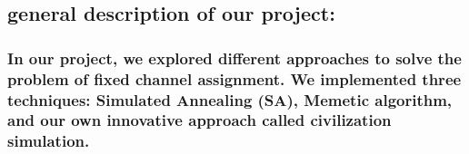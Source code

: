\documentclass[11pt]{article}
\begin{document}
    \hypertarget{general-description-of-our-project}{%
\subsection{\texorpdfstring{ general description of our
project:}{  general description of our project:}}\label{general-description-of-our-project}}

    \hypertarget{in-our-project-we-explored-different-approaches-to-solve-the-problem-of-fixed-channel-assignment.-we-implemented-three-techniques-simulated-annealing-sa-memetic-algorithm-and-our-own-innovative-approach-called-civilization-simulation.}{%
\subsubsection{\texorpdfstring{ In our project, we explored different
approaches to solve the problem of fixed channel assignment. We
implemented three techniques: Simulated Annealing (SA), Memetic
algorithm, and our own innovative approach called civilization
simulation.}{  In our project, we explored different approaches to solve the problem of fixed channel assignment. We implemented three techniques: Simulated Annealing (SA), Memetic algorithm, and our own innovative approach called civilization simulation.}}\label{in-our-project-we-explored-different-approaches-to-solve-the-problem-of-fixed-channel-assignment.-we-implemented-three-techniques-simulated-annealing-sa-memetic-algorithm-and-our-own-innovative-approach-called-civilization-simulation.}}
\end{document}
